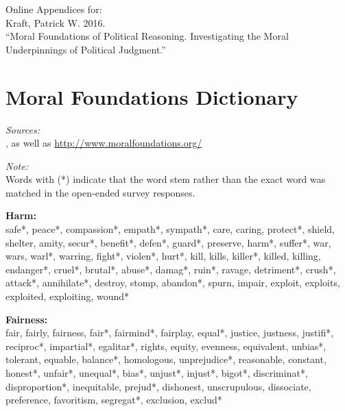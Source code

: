 \documentclass[12pt]{article}
\begin{document}
\clearpage\normalsize\singlespacing



\clearpage\footnotesize\singlespacing
\appendices
\appendixpage
\renewcommand\thesubsection{\Roman{subsection}}
\begin{flushleft}
Online Appendices for: \\
Kraft, Patrick W. 2016.\\``Moral Foundations of Political Reasoning. Investigating the Moral Underpinnings of Political Judgment.''

\startcontents[sections]
\clearpage

\section{Moral Foundations Dictionary}\label{app:dict}
\renewcommand\thefigure{\thesection.\arabic{figure}}
\renewcommand\thetable{\thesection.\arabic{table}}
\setcounter{figure}{0}
\setcounter{table}{0}

\textit{Sources:}\\
\citet{graham2009liberals}, as well as \url{http://www.moralfoundations.org/}
\vspace{.5cm}

\textit{Note:}\\
Words with (*) indicate that the word stem rather than the exact word was matched in the open-ended survey responses.
\vspace{.5cm}

\textbf{Harm:}\\
safe*, peace*, compassion*, empath*, sympath*, care, caring, protect*, shield, shelter, amity, secur*, benefit*, defen*, guard*, preserve, harm*, suffer*, war, wars, warl*, warring, fight*, violen*, hurt*, kill, kills, killer*, killed, killing, endanger*, cruel*, brutal*, abuse*, damag*, ruin*, ravage, detriment*, crush*, attack*, annihilate*, destroy, stomp, abandon*, spurn, impair, exploit, exploits, exploited, exploiting, wound*
\vspace{.5cm}

\textbf{Fairness:}\\
fair, fairly, fairness, fair*, fairmind*, fairplay, equal*, justice, justness, justifi*, reciproc*, impartial*, egalitar*, rights, equity, evenness, equivalent, unbias*, tolerant, equable, balance*, homologous, unprejudice*, reasonable, constant, honest*, unfair*, unequal*, bias*, unjust*, injust*, bigot*, discriminat*, disproportion*, inequitable, prejud*, dishonest, unscrupulous, dissociate, preference, favoritism, segregat*, exclusion, exclud*
\vspace{.5cm}


\end{flushleft}
\end{document}
